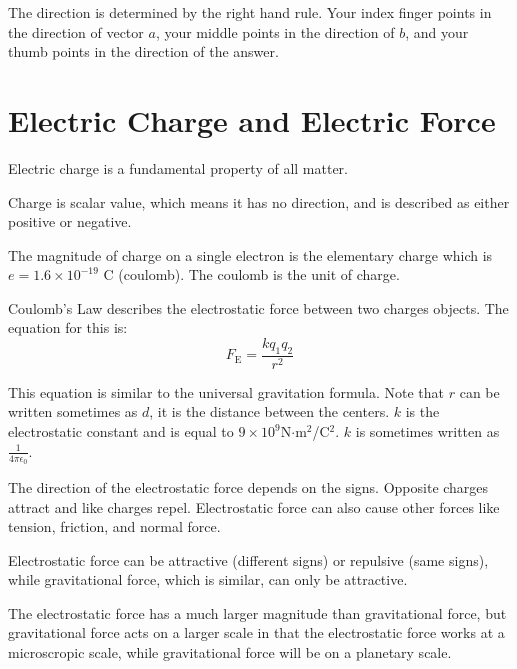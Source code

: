 \documentclass[../em.tex]{subfiles}
\begin{document}
The direction is determined by the right hand rule. Your index finger points in the direction of 
vector $a$, your middle points in the direction of $b$, and your thumb points in the direction of the answer.

\section{Electric Charge and Electric Force}
Electric charge is a fundamental property of all matter.

Charge is scalar value, which means it has no direction, and is described as either positive or negative.

The magnitude of charge on a single electron is the elementary charge which is 
$e = 1.6\times 10^{-19}$ C (coulomb). The coulomb is the unit of charge.

Coulomb's Law describes the electrostatic force between two charges objects. The equation for this is:
\[F_\text{E}=\frac{kq_1q_2}{r^2}\]

This equation is similar to the universal gravitation formula. Note that 
$r$ can be written sometimes as $d$, it is the distance between the centers. 
$k$ is the electrostatic constant and is equal to $9\times10^9$N$\cdot $m$^2$/C$^2$. $k$ 
is sometimes written as $\frac{1}{4\pi\epsilon_0}$.

The direction of the electrostatic force depends on the signs. 
Opposite charges attract and like charges repel. Electrostatic force can also cause 
other forces like tension, friction, and normal force.

Electrostatic force can be attractive (different signs) or repulsive (same signs), 
while gravitational force, which is similar, can only be attractive. 

The electrostatic force has a much larger magnitude than gravitational force, but 
gravitational force acts on a larger scale in that the electrostatic force works at a 
microscropic scale, while gravitational force will be on a planetary scale.
\end{document}
